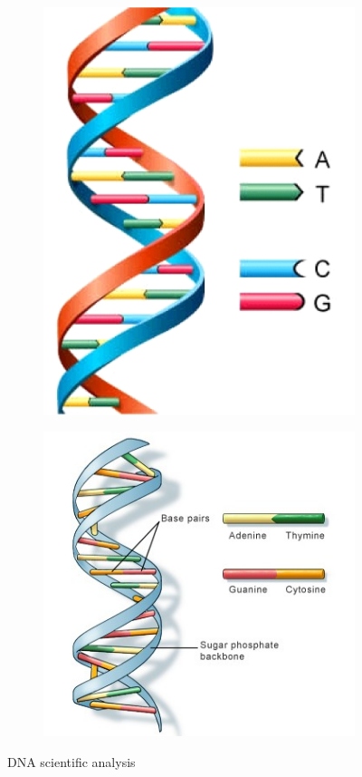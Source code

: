 \documentclass[12pt]{llncs}
\begin{document}
\begin{figure}
	\begin{subfigure}{.5\textwidth}
		\includegraphics[width=.6\linewidth]{./figs/DNA-2}
	\end{subfigure}
	\begin{subfigure}{.5\textwidth}
		\includegraphics[width=.9\linewidth]{./figs/DNA-3}
	\end{subfigure}
	\caption{\label{fig:fig-DNA-2}DNA scientific analysis}
\end{figure}
\end{document}
